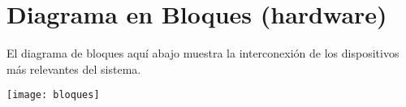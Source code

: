 \pagebreak
\section{Diagrama en Bloques (hardware)}
El diagrama de bloques aquí abajo muestra la interconexión de los dispositivos más relevantes del sistema.
\begin{center}
    \texttt{[image: bloques]}
\end{center}



